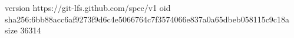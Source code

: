 version https://git-lfs.github.com/spec/v1
oid sha256:6bb88acc6af9273f9d6c4e5066764c7f3574066e837a0a65dbeb058115c9c18a
size 36314
